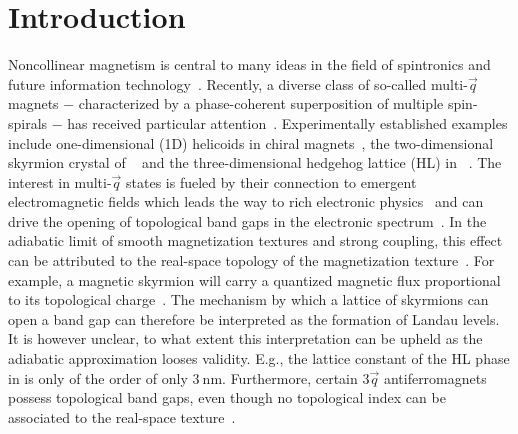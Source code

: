 \documentclass[
    10pt,
    aps,
    prb,
	longbibliography,
    twocolumn,
    floatfix,
    superscriptaddress,
]{revtex4-2}
\begin{document}
\section{Introduction}
Noncollinear magnetism is central to many ideas in the field of spintronics and future information technology~\cite{Vedmedenko2020, Back2020}.
Recently, a diverse class of so-called multi-$\vec{q}$ magnets $-$ characterized by a phase-coherent superposition of multiple spin-spirals $-$ has received particular attention~\cite{Okubo2012, Takagi2018, Hirschberger2019, Fujishiro2019, Okumura2020}.
Experimentally established examples include one-dimensional (1D) helicoids in chiral magnets~\cite{Adams2012,Janoschek2013}, the two-dimensional skyrmion crystal of ~\cite{Neubauer2009} and the three-dimensional hedgehog lattice (HL) in ~\cite{Tanigaki2015}.
The interest in multi-$\vec{q}$ states is fueled by their connection to emergent electromagnetic fields which leads the way to rich electronic physics~\cite{ Bliokh2005, Fujita2011}
and can drive the opening of topological band gaps in the electronic spectrum~\cite{Hamamoto2015, Goebel2017, Goebel2018}.
In the adiabatic limit of smooth magnetization textures and strong coupling, this effect can be attributed to the real-space topology of the magnetization texture~\cite{Bruno2004, EverschorSitte2014}.
For example, a magnetic skyrmion will carry a quantized magnetic flux proportional to its topological charge~\cite{Nagaosa2013}. 
The mechanism by which a lattice of skyrmions can open a band gap can therefore be interpreted as the formation of Landau levels.
It is however unclear, to what extent this interpretation can be upheld as the adiabatic approximation looses validity.
E.g., the lattice constant of the HL phase in  is only of the order of only $\SI{3}{\nano\meter}$.
Furthermore, certain $3\vec{q}$ antiferromagnets possess topological band gaps, even though no topological index can be associated to the real-space texture~\cite{Ndiaye2019, Feng2020}.
\end{document}
